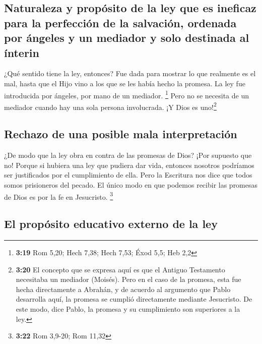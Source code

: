 \hypertarget{naturaleza-y-propuxf3sito-de-la-ley-que-es-ineficaz-para-la-perfecciuxf3n-de-la-salvaciuxf3n-ordenada-por-uxe1ngeles-y-un-mediador-y-solo-destinada-al-uxednterin}{%
\subsection{Naturaleza y propósito de la ley que es ineficaz para la
perfección de la salvación, ordenada por ángeles y un mediador y solo
destinada al
ínterin}\label{naturaleza-y-propuxf3sito-de-la-ley-que-es-ineficaz-para-la-perfecciuxf3n-de-la-salvaciuxf3n-ordenada-por-uxe1ngeles-y-un-mediador-y-solo-destinada-al-uxednterin}}

 ¿Qué sentido tiene la ley, entonces? Fue dada para
mostrar lo que realmente es el mal, hasta que el Hijo vino a los que se
les había hecho la promesa. La ley fue introducida por ángeles, por mano
de un mediador. \footnote{\textbf{3:19} Rom 5,20; Hech 7,38; Hech 7,53;
  Éxod 5,5; Heb 2,2}  Pero no se necesita de un mediador
cuando hay una sola persona involucrada. ¡Y Dios es uno!\footnote{\textbf{3:20}
  El concepto que se expresa aquí es que el Antiguo Testamento
  necesitaba un mediador (Moisés). Pero en el caso de la promesa, esta
  fue hecha directamente a Abrahán, y de acuerdo al argumento que Pablo
  desarrolla aquí, la promesa se cumplió directamente mediante
  Jesucristo. De este modo, dice Pablo, la promesa y su cumplimiento son
  superiores a la ley.}

\hypertarget{rechazo-de-una-posible-mala-interpretaciuxf3n}{%
\subsection{Rechazo de una posible mala
interpretación}\label{rechazo-de-una-posible-mala-interpretaciuxf3n}}

 ¿De modo que la ley obra en contra de las promesas de
Dios? ¡Por supuesto que no! Porque si hubiera una ley que pudiera dar
vida, entonces nosotros podríamos ser justificados por el cumplimiento
de ella.  Pero la Escritura nos dice que todos somos
prisioneros del pecado. El único modo en que podemos recibir las
promesas de Dios es por la fe en Jesucristo. \footnote{\textbf{3:22} Rom
  3,9-20; Rom 11,32}

\hypertarget{el-propuxf3sito-educativo-externo-de-la-ley}{%
\subsection{El propósito educativo externo de la
ley}\label{el-propuxf3sito-educativo-externo-de-la-ley}}

